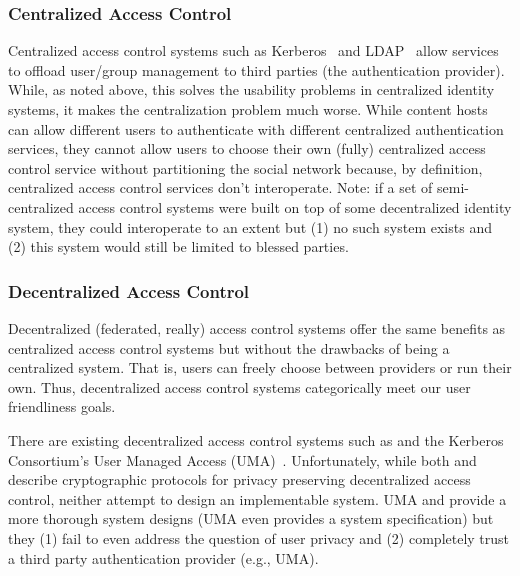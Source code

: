 \documentclass[pdftex,12pt,a4papaer,twoside,notitlepage]{report}
\begin{document}
\subsubsection{Centralized Access Control}

Centralized access control systems such as Kerberos~\cite{kerberos} and
LDAP~\cite{ldap} allow services to offload user/group management to third
parties (the authentication provider). While, as noted above, this solves the
usability problems in centralized identity systems, it makes the centralization
problem much worse. While content hosts can allow different users to
authenticate with different centralized authentication services, they cannot
allow users to choose their own (fully) centralized access control service
without partitioning the social network because, by definition, centralized
access control services don't interoperate. Note: if a set of semi-centralized
access control systems were built on top of some decentralized identity system,
they could interoperate to an extent but (1) no such system exists and (2) this
system would still be limited to blessed parties.

\subsubsection{Decentralized Access Control}

Decentralized (federated, really) access control systems offer the same benefits
as centralized access control systems but without the drawbacks of being a
centralized system. That is, users can freely choose between providers or run
their own. Thus, decentralized access control systems categorically meet our
user friendliness goals.

There are existing decentralized access control systems such as \cite{attrib}
\cite{privattrib} \cite{drbac} \cite{socnet} and the Kerberos Consortium's User
Managed Access (UMA)~\cite{uma}. Unfortunately, while both \cite{attrib} and
\cite{privattrib} describe cryptographic protocols for privacy preserving
decentralized access control, neither attempt to design an implementable system.
UMA\cite{uma} \cite{drbac} and \cite{socnet} provide a more thorough system
designs (UMA even provides a system specification) but they (1) fail to even
address the question of user privacy and (2) completely trust a third party
authentication provider (e.g., UMA).
\end{document}
